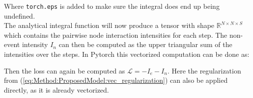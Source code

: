 Where \texttt{torch.eps} is added to make sure the integral does end up being undefined.
\\
The analytical integral function will now produce a tensor with shape $\mathbb{R}^{N \times N \times S}$ which contains the pairwise node interaction intensities for each step. The non-event intensity $I_n$ can then be computed as the upper triangular sum of the intensities over the steps. In Pytorch this vectorized computation can be done as:


\noindent
Then the loss can again be computed as $\mathcal{L} = - I_e - I_n$. Here the regularization from (\ref{eq:Method:ProposedModel:vec_regularization}) can also be applied directly, as it is already vectorized.
